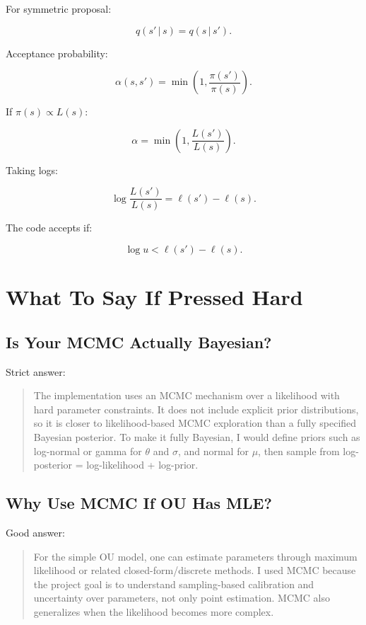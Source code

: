 \documentclass[11pt]{article}
\newcommand{\given}{\,|\,}
\begin{document}
For symmetric proposal:

\[
q(s'\given s)=q(s\given s').
\]

Acceptance probability:

\[
\alpha(s,s')=\min\left(1,\frac{\pi(s')}{\pi(s)}\right).
\]

If $\pi(s)\propto L(s)$:

\[
\alpha=\min\left(1,\frac{L(s')}{L(s)}\right).
\]

Taking logs:

\[
\log\frac{L(s')}{L(s)} = \ell(s')-\ell(s).
\]

The code accepts if:

\[
\log u < \ell(s')-\ell(s).
\]

\section{What To Say If Pressed Hard}

\subsection{Is Your MCMC Actually Bayesian?}

Strict answer:

\begin{quote}
The implementation uses an MCMC mechanism over a likelihood with hard parameter
constraints. It does not include explicit prior distributions, so it is closer
to likelihood-based MCMC exploration than a fully specified Bayesian posterior.
To make it fully Bayesian, I would define priors such as log-normal or gamma for
$\theta$ and $\sigma$, and normal for $\mu$, then sample from log-posterior =
log-likelihood + log-prior.
\end{quote}

\subsection{Why Use MCMC If OU Has MLE?}

Good answer:

\begin{quote}
For the simple OU model, one can estimate parameters through maximum likelihood
or related closed-form/discrete methods. I used MCMC because the project goal is
to understand sampling-based calibration and uncertainty over parameters, not
only point estimation. MCMC also generalizes when the likelihood becomes more
complex.
\end{quote}
\end{document}
